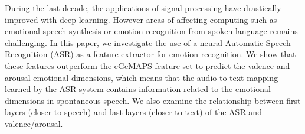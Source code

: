 During the last decade, the applications of signal processing have drastically improved with deep learning. However areas of affecting computing such as emotional speech synthesis or emotion recognition from spoken language remains challenging. In this paper, we investigate the use of a neural Automatic Speech Recognition (ASR) as a feature extractor for emotion recognition.  We show that these features outperform the eGeMAPS feature set to predict the valence and arousal emotional dimensions, which means that the audio-to-text mapping learned by the ASR system contains information related to the emotional dimensions in spontaneous speech. We also examine the relationship between first layers (closer to speech) and last layers (closer to text) of the ASR and valence/arousal.
